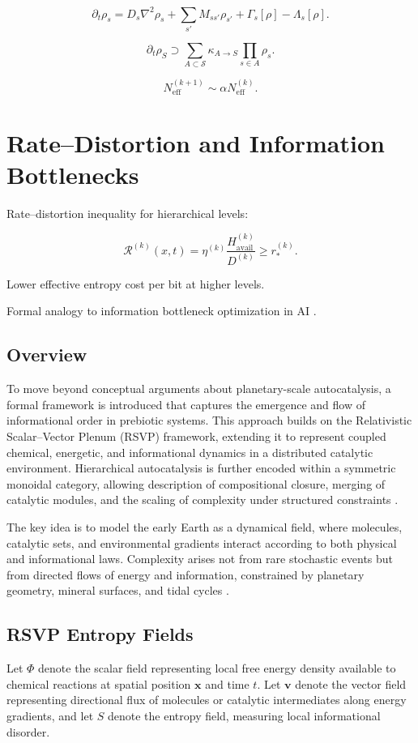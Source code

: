 \documentclass{book}
\begin{document}
\[\partial_t \rho_s = D_s \nabla^2 \rho_s + \sum_{s'} M_{s s'} \rho_{s'} + \Gamma_s[\rho] - \Lambda_s[\rho].\]

\[\partial_t \rho_{S} \supset \sum_{A\subset \mathcal{S}} \kappa_{A\to S}\prod_{s\in A}\rho_s.\]

\[N_{\mathrm{eff}}^{(k+1)} \sim \alpha N_{\mathrm{eff}}^{(k)}.\]

\chapter{Rate–Distortion and Information Bottlenecks}
Rate–distortion inequality for hierarchical levels:

\[\mathcal{R}^{(k)}(x,t) = \eta^{(k)} \frac{H^{(k)}_{\mathrm{avail}}}{D^{(k)}} \ge r_\ast^{(k)}.\]

Lower effective entropy cost per bit at higher levels.

Formal analogy to information bottleneck optimization in AI \citep{scalinghypothesis}.

\section{Overview}
To move beyond conceptual arguments about planetary-scale autocatalysis, a formal framework is introduced that captures the emergence and flow of informational order in prebiotic systems. This approach builds on the Relativistic Scalar–Vector Plenum (RSVP) framework, extending it to represent coupled chemical, energetic, and informational dynamics in a distributed catalytic environment. Hierarchical autocatalysis is further encoded within a symmetric monoidal category, allowing description of compositional closure, merging of catalytic modules, and the scaling of complexity under structured constraints \citep{hordijk2010, steel2013}.

The key idea is to model the early Earth as a dynamical field, where molecules, catalytic sets, and environmental gradients interact according to both physical and informational laws. Complexity arises not from rare stochastic events but from directed flows of energy and information, constrained by planetary geometry, mineral surfaces, and tidal cycles \citep{plum2025}.

\section{RSVP Entropy Fields}
Let $\Phi$ denote the scalar field representing local free energy density available to chemical reactions at spatial position $\mathbf{x}$ and time $t$. Let $\mathbf{v}$ denote the vector field representing directional flux of molecules or catalytic intermediates along energy gradients, and let $S$ denote the entropy field, measuring local informational disorder.
\end{document}
